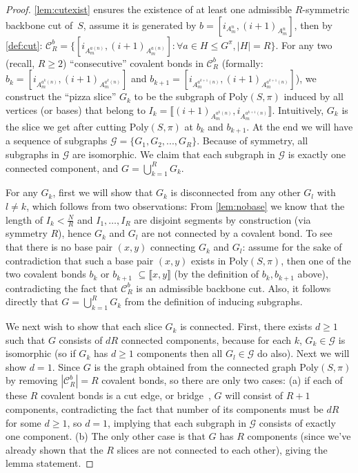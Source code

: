 \documentclass[11pt,letterpaper]{article}  \usepackage[margin=1in]{geometry}
\theoremstyle{definition}  \newtheorem{Definition}[theorem]{Definition}
\newcommand{\PolySpi}{\ensuremath{\mathrm{Poly}(S,\pi)}\xspace}
\begin{document}
\begin{proof}  
	\cref{lem:cutexist} ensures the existence of at least one admissible $R$-symmetric backbone cut of~$S$, assume it is generated by $b=[i_{A_m^n}, (i+1)_{A_m^n}]$, then by \cref{def:cut}:  $\mathcal{C}_R^b = \{ [i_{A_m^{a(n)}}, ({i+1})_{A_{m}^{a(n)}}]: \forall a \in H \!\!\leq \! G^\pi, |H| = R \}$. For any two (recall, $R\geq 2$) ``consecutive'' covalent bonds  in $\mathcal{C}_R^b$ (formally:   $b_k=[i_{A_m^{a^k(n)}}, ({i+1})_{A_{m}^{a^k(n)}}]$ and  $b_{k+1}=[i_{A_m^{a^{k+1}(n)}}, ({i+1})_{A_{m}^{a^{k+1}(n)}}]$),
	we construct the ``pizza slice'' $G_k$ to be the subgraph of $\PolySpi$ induced by all vertices (or bases) that belong to $I_k = \llbracket ({i+1})_{A_{m}^{a^k(n)}},{i}_{A_{m}^{a^{k+1}(n)}} \rrbracket$. Intuitively, $G_k$ is the slice we get after cutting $\PolySpi$ at $b_k$ and $b_{k+1}$. At the end we will have a sequence of subgraphs $\mathcal{G} = \{G_1,G_2, ... , G_R\}$. Because of symmetry, all subgraphs in $\mathcal{G}$ are isomorphic. We claim that each subgraph in $\mathcal{G}$ is exactly one connected component, and $G = \bigcup_{k=1}^R G_k$. 
	
	For any $G_k$, first we will show that $G_k$ is disconnected from any other $G_{l}$ with $l \neq k$, which follows from two observations:  
	From \cref{lem:nobase} we know that the length of $I_k < \frac{N}{R}$ and $I_1, \ldots , I_R$ are disjoint segments by construction (via symmetry $R$), hence $G_k$ and  $G_l$ are not connected by a covalent bond. 
	To see that  there is no base pair $(x,y)$ connecting $G_k$ and $G_l$:  
	assume for the sake of contradiction that such a base pair $(x,y)$ exists in $\PolySpi$, then one of the two covalent bonds $b_k$ or $b_{k+1}$   $\subseteq \llbracket x,y \rrbracket$ (by the definition of $b_k, b_{k+1}$ above), contradicting the fact that $\mathcal{C}_R^b$ is an admissible backbone cut. Also, it follows directly that $G = \bigcup_{k=1}^R G_k$ from the definition of inducing subgraphs. 
	
	We next wish to show that each slice $G_k$ is connected. 
	First, there exists $d \geq 1$ such that  $G$ consists of $dR$ connected components, 
	because for each $k$, $G_k \in \mathcal{G}$ is isomorphic  
	(so if $G_k$ has $d\geq 1$ components then all $G_l \in \mathcal{G}$ do also). Next we  will show $d=1$. 
	Since $G$ is the graph obtained from the connected graph $\PolySpi$ by removing $|\mathcal{C}_R^b| = R$ covalent bonds, so there are only two cases: 
	(a) 
	if each of these $R$ covalent bonds is a cut edge, or bridge~\cite{west2001introduction}, 
	$G$ will consist of $R+1$ components, 
	contradicting the fact that number of its components must be $dR$ for some $d\geq 1$, so $d = 1$, implying that each subgraph in $\mathcal{G}$ consists of exactly one component. 
	(b) The only other case is that $G$ has $R$ components (since we've already shown that the $R$ slices are not connected to each other), giving the lemma statement. 
\end{proof}
\end{document}
